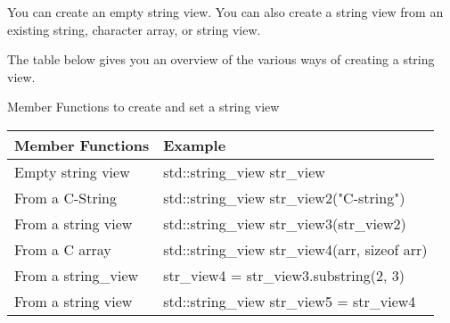 You can create an empty string view. You can also create a string view from an existing string, character array, or string view.

The table below gives you an overview of the various ways of creating a string view.

\begin{center}
Member Functions to create and set a string view
\end{center}

\begin{longtable}[c]{|l|l|}
\hline
\textbf{Member Functions} & \textbf{Example}                              \\ \hline
\endfirsthead
%
\endhead
%
Empty string view         & std::string\_view str\_view                   \\ \hline
From a C-String           & std::string\_view str\_view2("C-string")      \\ \hline
From a string view        & std::string\_view str\_view3(str\_view2)      \\ \hline
From a C array            & std::string\_view str\_view4(arr, sizeof arr) \\ \hline
From a string\_view       & str\_view4 = str\_view3.substring(2, 3)       \\ \hline
From a string view        & std::string\_view str\_view5 = str\_view4     \\ \hline
\end{longtable}























